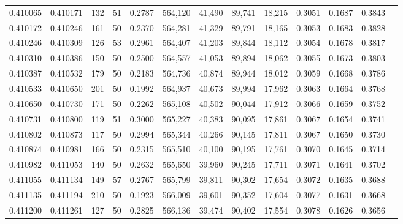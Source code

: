 \begin{tabular}{rrrrrrrrrrrrr}
0.410065 & 0.410171 &   132 &  51 &                                     0.2787 & 564,120 &  41,490 &  89,741 &  18,215 & 0.3051 & 0.1687 & 0.3843 \\
0.410172 & 0.410246 &   161 &  50 &                                     0.2370 & 564,281 &  41,329 &  89,791 &  18,165 & 0.3053 & 0.1683 & 0.3828 \\
0.410246 & 0.410309 &   126 &  53 &                                     0.2961 & 564,407 &  41,203 &  89,844 &  18,112 & 0.3054 & 0.1678 & 0.3817 \\
0.410310 & 0.410386 &   150 &  50 &                                     0.2500 & 564,557 &  41,053 &  89,894 &  18,062 & 0.3055 & 0.1673 & 0.3803 \\
0.410387 & 0.410532 &   179 &  50 &                                     0.2183 & 564,736 &  40,874 &  89,944 &  18,012 & 0.3059 & 0.1668 & 0.3786 \\
0.410533 & 0.410650 &   201 &  50 &                                     0.1992 & 564,937 &  40,673 &  89,994 &  17,962 & 0.3063 & 0.1664 & 0.3768 \\
0.410650 & 0.410730 &   171 &  50 &                                     0.2262 & 565,108 &  40,502 &  90,044 &  17,912 & 0.3066 & 0.1659 & 0.3752 \\
0.410731 & 0.410800 &   119 &  51 &                                     0.3000 & 565,227 &  40,383 &  90,095 &  17,861 & 0.3067 & 0.1654 & 0.3741 \\
0.410802 & 0.410873 &   117 &  50 &                                     0.2994 & 565,344 &  40,266 &  90,145 &  17,811 & 0.3067 & 0.1650 & 0.3730 \\
0.410874 & 0.410981 &   166 &  50 &                                     0.2315 & 565,510 &  40,100 &  90,195 &  17,761 & 0.3070 & 0.1645 & 0.3714 \\
0.410982 & 0.411053 &   140 &  50 &                                     0.2632 & 565,650 &  39,960 &  90,245 &  17,711 & 0.3071 & 0.1641 & 0.3702 \\
0.411055 & 0.411134 &   149 &  57 &                                     0.2767 & 565,799 &  39,811 &  90,302 &  17,654 & 0.3072 & 0.1635 & 0.3688 \\
0.411135 & 0.411194 &   210 &  50 &                                     0.1923 & 566,009 &  39,601 &  90,352 &  17,604 & 0.3077 & 0.1631 & 0.3668 \\
0.411200 & 0.411261 &   127 &  50 &                                     0.2825 & 566,136 &  39,474 &  90,402 &  17,554 & 0.3078 & 0.1626 & 0.3656 \\

\end{tabular}

